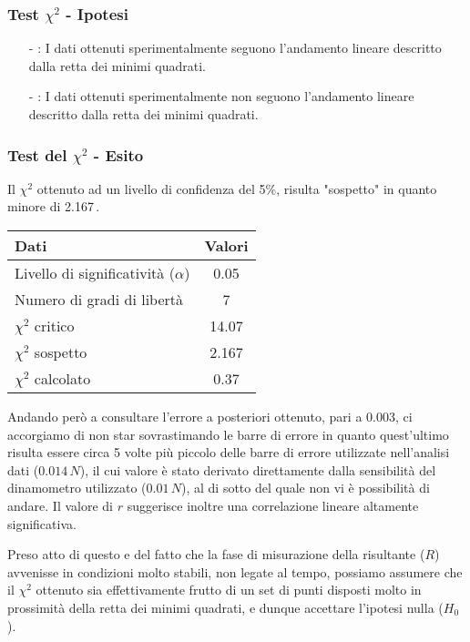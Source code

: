 \documentclass{article}
\begin{document}
\subsubsection{Test $\chi^2$ - Ipotesi}
\begin{itemize}
    \item[-]: I dati ottenuti sperimentalmente seguono l'andamento lineare descritto dalla retta dei minimi quadrati.
    \item[-]: I dati ottenuti sperimentalmente non seguono l'andamento lineare descritto dalla retta dei minimi quadrati.
\end{itemize}

\subsubsection{Test del $\chi^2$ - Esito}
Il $\chi^2$ ottenuto ad un livello di confidenza del 5\%, risulta "sospetto" in quanto minore di 2.167\,. 
\begin{wraptable}{r}{6.5cm}
	\centering
	\begin{tabular}{@{}lc@{}}
		\toprule
		\textbf{Dati} & \textbf{Valori} \\
		\midrule
		Livello di significatività ($\alpha $) & 0.05 \\
		Numero di gradi di libertà & 7\\
		$\chi^2$ critico & 14.07\\
        $\chi^2$ sospetto & 2.167\\
		$\chi^2$ calcolato & 0.37\\
		\bottomrule
	\end{tabular}
\end{wraptable}
Andando però a consultare l'errore a posteriori ottenuto, pari a 0.003, ci accorgiamo di non star sovrastimando le barre di errore in quanto quest'ultimo risulta essere circa 5 volte più piccolo delle barre di errore utilizzate nell'analisi dati ($0.014\,N$), il cui valore è stato derivato direttamente dalla sensibilità del dinamometro utilizzato ($0.01\,N$), al di sotto del quale non vi è possibilità di andare. Il valore di $r$ suggerisce inoltre una correlazione lineare altamente significativa. 

Preso atto di questo e del fatto che la fase di misurazione della risultante ($R$) avvenisse in condizioni molto stabili, non legate al tempo, possiamo assumere che il $\chi^2$ ottenuto sia effettivamente frutto di un set di punti disposti molto in prossimità della retta dei minimi quadrati, e dunque accettare l'ipotesi nulla ($H_0$).\medskip
\end{document}
